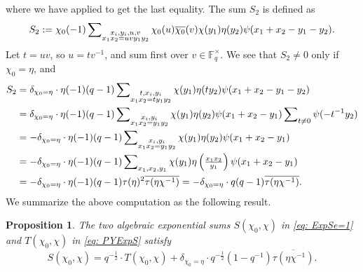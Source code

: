\documentclass[A4]{amsart}
\newtheorem{proposition}[theorem]{Proposition}
\numberwithin{equation}{section} \everymath{\displaystyle}
\newcommand{\fF}{\mathbb{F}}
\begin{document}
	where we have applied \cite[Theorem 1.1]{Xi23} to get the last equality. The sum $S_2$ is defined as
	$$ S_2 := \chi_0(-1) \sideset{}{_{\substack{x_i,y_i,u,v \\ x_1x_2 = uv y_1y_2}}} \sum \chi_0(u) \overline{\chi_0}(v) \chi(y_1) \eta(y_2) \psi(x_1+x_2-y_1-y_2). $$
	Let $t = uv$, so $u = tv^{-1}$, and sum first over $v \in \fF_q^{\times}$. We see that $S_2 \neq 0$ only if $\chi_0=\eta$, and
\begin{align*}
	S_2 &= \delta_{\chi_0=\eta} \cdot \eta(-1) (q-1) \sideset{}{_{\substack{t,x_i,y_i \\ x_1x_2 = t y_1y_2}}} \sum \chi(y_1) \eta(ty_2) \psi(x_1+x_2-y_1-y_2) \\
	&= \delta_{\chi_0=\eta} \cdot \eta(-1) (q-1) \sideset{}{_{\substack{x_i,y_i \\ x_1x_2 = y_1y_2}}} \sum \chi(y_1) \eta(y_2) \psi(x_1+x_2-y_1) \sideset{}{_{t \neq 0}} \sum \psi(-t^{-1}y_2) \\
	&= -\delta_{\chi_0=\eta} \cdot \eta(-1) (q-1) \sideset{}{_{\substack{x_i,y_i \\ x_1x_2 = y_1y_2}}} \sum \chi(y_1) \eta(y_2) \psi(x_1+x_2-y_1) \\
	&= - \delta_{\chi_0=\eta} \cdot \eta(-1) (q-1) \sideset{}{_{x_1,x_2,y_1}} \sum \chi(y_1) \eta \left( \tfrac{x_1x_2}{y_1} \right) \psi(x_1+x_2-y_1) \\
	&= - \delta_{\chi_0=\eta} \cdot \eta(-1) (q-1) \tau(\eta)^2 \overline{\tau(\eta \chi^{-1})} = - \delta_{\chi_0=\eta} \cdot q(q-1) \overline{\tau(\eta \chi^{-1})}.
\end{align*}
	We summarize the above computation as the following result.
\begin{proposition}
	The two algebraic exponential sums $S(\chi_0,\chi)$ in \eqref{eq: ExpSe=1} and $T(\chi_0,\chi)$ in \eqref{eq: PYExpS} satisfy
	$$ S(\chi_0,\chi) = q^{-\frac{1}{2}} \cdot T(\chi_0,\chi) + \delta_{\chi_0=\eta} \cdot q^{-\frac{1}{2}}(1-q^{-1}) \overline{\tau(\eta \chi^{-1})}. $$
\end{proposition}
	



	

	
	
\end{document}
